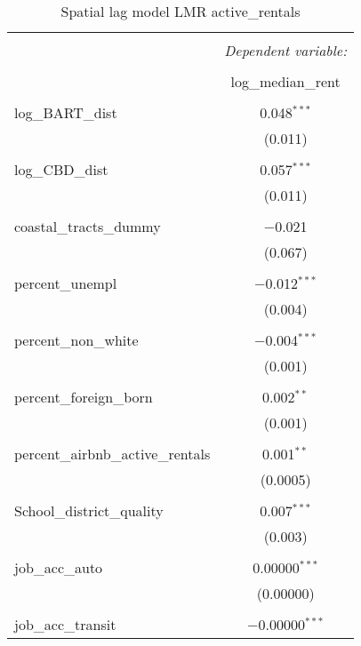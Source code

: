 \documentclass[10pt, letterpaper]{amsart}
\begin{document}
\begin{table}[H] \centering 
  \caption{Spatial lag model LMR active\_rentals}
  \label{}
  \begin{tabular}{@{\extracolsep{5pt}}lc} 
    \\[-1.8ex]\hline 
    \hline \\[-1.8ex] 
    & \multicolumn{1}{c}{\textit{Dependent variable:}} \\ 
    \cline{2-2} 
    \\[-1.8ex] & log\_median\_rent \\ 
    \hline \\[-1.8ex] 
    log\_BART\_dist & 0.048$^{***}$ \\ 
    & (0.011) \\ 
    & \\ 
    log\_CBD\_dist & 0.057$^{***}$ \\ 
    & (0.011) \\ 
    & \\ 
    coastal\_tracts\_dummy & $-$0.021 \\ 
    & (0.067) \\ 
    & \\ 
    percent\_unempl & $-$0.012$^{***}$ \\ 
    & (0.004) \\ 
    & \\ 
    percent\_non\_white & $-$0.004$^{***}$ \\ 
    & (0.001) \\ 
    & \\ 
    percent\_foreign\_born & 0.002$^{**}$ \\ 
    & (0.001) \\ 
    & \\ 
    percent\_airbnb\_active\_rentals & 0.001$^{**}$ \\ 
    & (0.0005) \\ 
    & \\ 
    School\_district\_quality & 0.007$^{***}$ \\ 
    & (0.003) \\ 
    & \\ 
    job\_acc\_auto & 0.00000$^{***}$ \\ 
    & (0.00000) \\ 
    & \\ 
    job\_acc\_transit & $-$0.00000$^{***}$ \\ 

\end{tabular}
\end{table}
\end{document}
